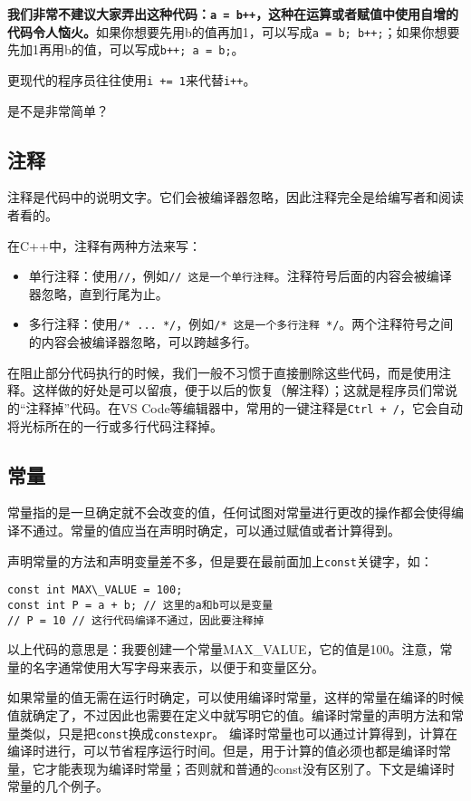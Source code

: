 \documentclass[../main.tex]{subfiles}
\begin{document}
\textbf{我们非常不建议大家弄出这种代码：\texttt{a = b++}，这种在运算或者赋值中使用自增的代码令人恼火。}如果你想要先用b的值再加1，可以写成\texttt{a = b; b++;}；如果你想要先加1再用b的值，可以写成\texttt{b++; a = b;}。

更现代的程序员往往使用\texttt{i += 1}来代替\texttt{i++}。

是不是非常简单？

\subsection{注释}

注释是代码中的说明文字。它们会被编译器忽略，因此注释完全是给编写者和阅读者看的。

在C++中，注释有两种方法来写：
\begin{itemize}
  \item 单行注释：使用\texttt{//}，例如\texttt{// 这是一个单行注释}。注释符号后面的内容会被编译器忽略，直到行尾为止。
  \item 多行注释：使用\texttt{/* ... */}，例如\texttt{/* 这是一个多行注释 */}。两个注释符号之间的内容会被编译器忽略，可以跨越多行。
\end{itemize}

在阻止部分代码执行的时候，我们一般不习惯于直接删除这些代码，而是使用注释。这样做的好处是可以留痕，便于以后的恢复（解注释）；这就是程序员们常说的“注释掉”代码。在VS Code等编辑器中，常用的一键注释是\texttt{Ctrl + /}，它会自动将光标所在的一行或多行代码注释掉。

\subsection{常量}
常量指的是一旦确定就不会改变的值，任何试图对常量进行更改的操作都会使得编译不通过。常量的值应当在声明时确定，可以通过赋值或者计算得到。

声明常量的方法和声明变量差不多，但是要在最前面加上\texttt{const}关键字，如：
\begin{lstlisting}
const int MAX\_VALUE = 100;
const int P = a + b; // 这里的a和b可以是变量
// P = 10 // 这行代码编译不通过，因此要注释掉
\end{lstlisting}

以上代码的意思是：我要创建一个常量MAX\_VALUE，它的值是100。注意，常量的名字通常使用大写字母来表示，以便于和变量区分。

如果常量的值无需在运行时确定，可以使用编译时常量，这样的常量在编译的时候值就确定了，不过因此也需要在定义中就写明它的值。编译时常量的声明方法和常量类似，只是把\texttt{const}换成\texttt{constexpr}。
编译时常量也可以通过计算得到，计算在编译时进行，可以节省程序运行时间。但是，用于计算的值必须也都是编译时常量，它才能表现为编译时常量；否则就和普通的const没有区别了。下文是编译时常量的几个例子。
\end{document}
